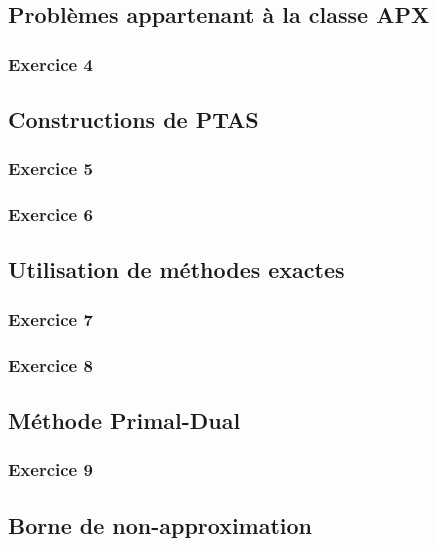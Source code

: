 \documentclass[a4paper, 12pt]{article}
\begin{document}
\subsection{Problèmes appartenant à la classe APX}

\subsubsection*{Exercice 4}


\subsection{Constructions de PTAS}

\subsubsection*{Exercice 5}


\subsubsection*{Exercice 6}


\subsection{Utilisation de méthodes exactes}

\subsubsection*{Exercice 7}


\subsubsection*{Exercice 8}


\subsection{Méthode Primal-Dual}

\subsubsection*{Exercice 9}


\subsection{Borne de non-approximation}
\end{document}

